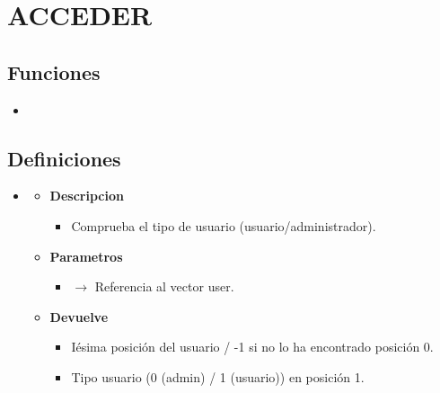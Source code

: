 \section{ACCEDER}

\subsection{Funciones}
\begin{itemize}
    \item {}
   
\end{itemize}
\subsection{Definiciones}
\begin{itemize}
    \item \label{initviajes}
    \begin{itemize}
        \item \textbf{Descripcion}
        \begin{itemize}
			\item Comprueba el tipo de usuario (usuario/administrador).
		\end{itemize}
		\item \textbf{Parametros}
		\begin{itemize}
			\item {} $\rightarrow$ Referencia al vector user.
		\end{itemize}
		\item \textbf{Devuelve}
		\begin{itemize}
			\item Iésima posición del usuario / -1 si no lo ha encontrado posición 0.
			\item Tipo usuario (0 (admin) / 1 (usuario)) en posición 1.
		\end{itemize}
	\end{itemize}

\end{itemize}
